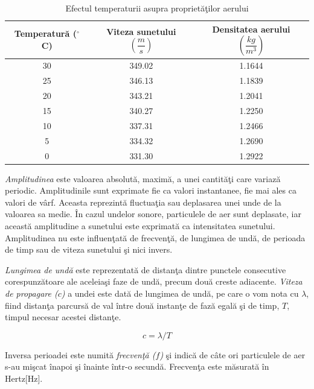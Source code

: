 	 
	\begin{table}[!htb]
		\centering		
	\begin{tabular}{|c|c|c|}
		\hline
		\bf{Temperatur\u{a} ($^{\circ}$C)} & \bf{Viteza sunetului $\left(\dfrac{m}{s} \right)$} & \bf{Densitatea aerului $\left(\dfrac{kg}{m^3}\right)$}\\
		\hline \hline
		
		30 & 349.02 & 1.1644\\
		\hline
		25 & 346.13 & 1.1839\\
		\hline
		20 & 343.21 & 1.2041\\
		\hline
		15 & 340.27 & 1.2250\\
		\hline
		10 & 337.31 & 1.2466\\
		\hline
		5 & 334.32 & 1.2690\\
		\hline
		0 & 331.30 & 1.2922\\
		\hline			
	\end{tabular}
	\caption{Efectul temperaturii asupra propriet\u{a}\c{t}ilor aerului\cite{temperaturaTabel}}
	\label{Tabel1}
	\end{table}

	{\it{Amplitudinea}} este valoarea absolut\u{a}, maxim\u{a}, a unei cantit\u{a}\c{t}i care variaz\u{a} periodic. Amplitudinile sunt exprimate fie ca valori instantanee, fie mai ales ca valori de v\^{a}rf. Aceasta reprezint\u{a} fluctua\c{t}ia sau deplasarea unei unde de la valoarea sa medie. \^{I}n cazul undelor sonore, particulele de aer sunt deplasate, iar aceast\u{a} amplitudine a sunetului este exprimat\u{a} ca intensitatea sunetului. Amplitudinea nu este influen\c{t}at\u{a} de frecven\c{t}\u{a}, de lungimea de und\u{a}, de perioada de timp sau de viteza sunetului \c{s}i nici invers.
	 
	{\it{Lungimea de und\u{a}}} este reprezentat\u{a} de distan\c{t}a dintre punctele consecutive corespunz\u{a}toare ale aceleia\c{s}i faze de und\u{a}, precum dou\u{a} creste adiacente. {\it{Viteza de propagare ($c$)}} a undei este dat\u{a} de lungimea de und\u{a}, pe care o vom nota cu $\lambda$, fiind distan\c{t}a parcurs\u{a} de val \^{i}ntre dou\u{a} instan\c{t}e de faz\u{a} egal\u{a} \c{s}i de timp, $T$, timpul necesar acestei distan\c{t}e.
	
	\begin{equation}
	c=\lambda/T
	\end{equation}
	 	
	Inversa perioadei este numit\u{a} {\it{frecven\c{t}\u{a} ($f$)}} \c{s}i indic\u{a} de c\^{a}te ori particulele de aer s-au mi\c{s}cat \^{i}napoi \c{s}i \^{i}nainte \^{i}ntr-o secund\u{a}. Frecven\c{t}a este m\u{a}surat\u{a} \^{i}n Hertz[Hz].
	

